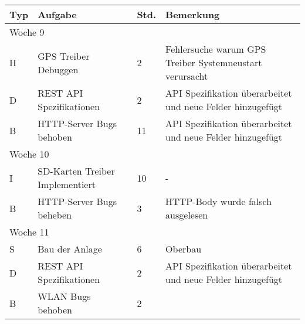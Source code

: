 \vspace{1em}
\begin{table}[!hp]
    \begin{center}
        \begin{tabular}{|p{0.8cm}|p{6cm}|p{0.8cm}|p{8cm}|} \hline
            \textbf{Typ} & \textbf{Aufgabe}                & \textbf{Std.} & \textbf{Bemerkung}                                                               \\ \hline
            \multicolumn{4}{|l|}{Woche 9}                                                                                                                     \\ \hline
            H            & GPS Treiber Debuggen            & 2             & Fehlersuche warum GPS Treiber Systemneustart verursacht                          \\
            D            & REST API Spezifikationen        & 2             & API Spezifikation überarbeitet und neue Felder hinzugefügt                       \\
            B            & HTTP-Server Bugs behoben        & 11            & API Spezifikation überarbeitet und neue Felder hinzugefügt                       \\ \hline
            \multicolumn{4}{|l|}{Woche 10}                                                                                                                    \\ \hline
            I            & SD-Karten Treiber Implementiert & 10            & -                                                                                \\
            B            & HTTP-Server Bugs beheben        & 3             & HTTP-Body wurde falsch ausgelesen                                                \\ \hline
            \multicolumn{4}{|l|}{Woche 11}                                                                                                                    \\ \hline
            S            & Bau der Anlage                  & 6             & Oberbau                                                                          \\
            D            & REST API Spezifikationen        & 2             & API Spezifikation überarbeitet und neue Felder hinzugefügt                       \\
            B            & WLAN Bugs behoben               & 2             &                                                                                  \\ \hline

\end{tabular}
\end{center}
\end{table}
